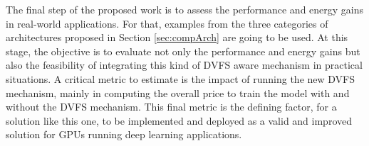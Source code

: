 The final step of the proposed work is to assess the performance and energy gains in real-world applications. For that, examples from the three categories of architectures proposed in Section \ref{sec:compArch} are going to be used. At this stage, the objective is to evaluate not only the performance and energy gains but also the feasibility of integrating this kind of DVFS aware mechanism in practical situations. A critical metric to estimate is the impact of running the new DVFS mechanism, mainly in computing the overall price to train the model with and without the DVFS mechanism. This final metric is the defining factor, for a solution like this one, to be implemented and deployed as a valid and improved solution for GPUs running deep learning applications.



